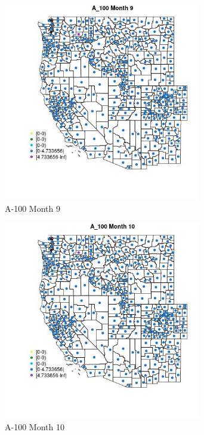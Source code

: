 \begin{figure} 
\centering  
\includegraphics[width=0.77\textwidth]{Code_Outputs/df_report_ML_predictors_CountyCentroid_Locations_Dates_2008-01-01to2018-12-31_MapObsMo9A_100.jpg} 
\caption{\label{fig:df_report_ML_predictors_CountyCentroid_Locations_Dates_2008-01-01to2018-12-31MapObsMo9A_100}A-100 Month 9} 
\end{figure} 
 

\begin{figure} 
\centering  
\includegraphics[width=0.77\textwidth]{Code_Outputs/df_report_ML_predictors_CountyCentroid_Locations_Dates_2008-01-01to2018-12-31_MapObsMo10A_100.jpg} 
\caption{\label{fig:df_report_ML_predictors_CountyCentroid_Locations_Dates_2008-01-01to2018-12-31MapObsMo10A_100}A-100 Month 10} 
\end{figure} 
 

